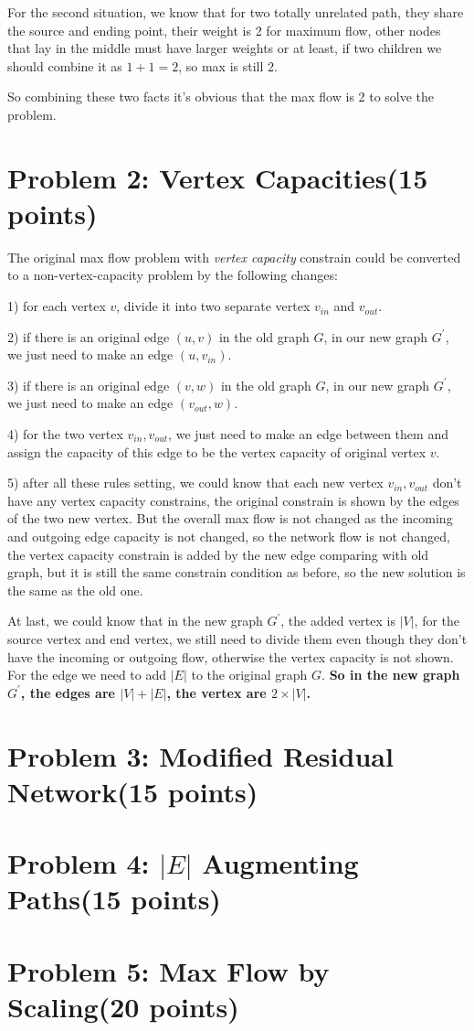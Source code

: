 \documentclass{article}
\begin{document}
For the second situation, we know that for two totally unrelated path, they share the source and ending point, their weight is 2 for maximum flow, other nodes that lay in the middle must have larger weights or at least, if two children we should combine it as $ 1 + 1 = 2 $, so max is still 2. 

So combining these two facts it's obvious that the max flow is 2 to solve the problem.

\section{Problem 2: Vertex Capacities(15 points)}
The original max flow problem with \textsl{vertex capacity} constrain could be converted to a non-vertex-capacity problem by the following changes:

1) for each vertex $v$, divide it into two separate vertex $v_{in}$ and $v_{out}$.

2) if there is an original edge $(u, v)$ in the old graph $G$, in our new graph $G^{'}$, we just need to make an
edge $(u, v_{in})$.

3) if there is an original edge $(v, w)$ in the old graph $G$, in our new graph $G^{'}$, we just need to make an
edge $(v_{out}, w)$.

4) for the two vertex $v_{in}, v_{out}$, we just need to make an edge between them and assign the capacity of this
edge to be the vertex capacity of original vertex $v$.

5) after all these rules setting, we could know that each new vertex $v_{in}, v_{out}$ don't have any vertex 
capacity constrains, the original constrain is shown by the edges of the two new vertex. But the overall max
flow is not changed as the incoming and outgoing edge capacity is not changed, so the network flow is not changed,
the vertex capacity constrain is added by the new edge comparing with old graph, but it is still the same constrain
condition as before, so the new solution is the same as the old one.

At last, we could know that in the new graph $G^{'}$, the added vertex is $|V|$, for the source vertex and end vertex,
we still need to divide them even though they don't have the incoming or outgoing flow, otherwise the vertex capacity
is not shown. For the edge we need to add $|E|$ to the original graph $G$. \textbf{So in the new graph $G^{'}$, the edges are $|V|+|E|$, the vertex are $2\times|V|$.}


\section{Problem 3: Modified Residual Network(15 points)}



\section{Problem 4: $|E|$  Augmenting Paths(15 points)}



\section{Problem 5: Max Flow by Scaling(20 points)}
\end{document}
